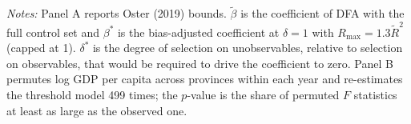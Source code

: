\begin{table}[H]
\caption{Oster bounds and randomisation inference.}\label{tab:idchecks}
\small


\vspace{3pt}
\parbox{\textwidth}{\footnotesize\textit{Notes:} Panel A reports Oster (2019) bounds. $\tilde{\beta}$ is the coefficient of DFA with the full control set and $\beta^{*}$ is the bias-adjusted coefficient at $\delta=1$ with $R_{\max}=1.3\tilde{R}^{2}$ (capped at 1). $\delta^{*}$ is the degree of selection on unobservables, relative to selection on observables, that would be required to drive the coefficient to zero. Panel B permutes log GDP per capita across provinces within each year and re-estimates the threshold model 499 times; the $p$-value is the share of permuted $F$ statistics at least as large as the observed one.}
\end{table}
